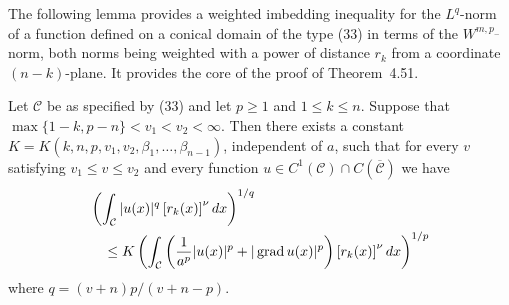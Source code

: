 The following lemma provides a weighted imbedding inequality for the $L^q$-norm of a function defined on a 
conical domain of the type (33) in terms of the $W^{m,p_{-}}$ norm, both norms being weighted with a power of 
distance $r_k$ from a coordinate $(n-k)$-plane. It provides the core of the proof of Theorem~4.51.


\begin{lemma}
  Let $\mathcal{C}$ be as specified by (33) and let $p \geq 1$ and $1 \leq k \leq n$.
  Suppose that $\max \{1-k, p-n\}<v_1<v_2<\infty$. Then there exists a constant
  $K=K\left(k, n, p, v_1, v_2, \beta_1, \ldots, \beta_{n-1}\right)$, independent of $a$,
  such that for every $v$ satisfying $v_1 \leq v \leq v_2$ and every function
  $u \in C^1(\mathcal{C}) \cap C(\overline{\mathcal{C}})$ we have
  \[
  \begin{aligned}
  & \left(\int_{\mathcal{C}}|u(x)|^q\left[r_k(x)\right]^\nu d x\right)^{1 / q} \\
  & \quad \leq K\left(\int_{\mathcal{C}}\left(\frac{1}{a^p}|u(x)|^p+|\operatorname{grad} u(x)|^p\right)\left[r_k(x)\right]^\nu d x\right)^{1 / p}
  \end{aligned}
  \]
  where $q=(v+n) p /(v+n-p)$.
\end{lemma}

